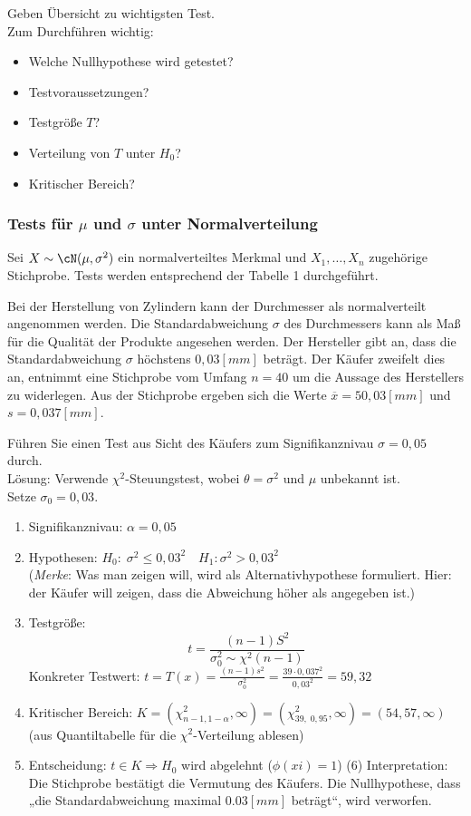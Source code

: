 \documentclass{scrreprt}
\begin{document}
Geben Übersicht zu wichtigsten Test.\\
Zum Durchführen wichtig:
\begin{itemize}
\item Welche Nullhypothese wird getestet?
\item Testvoraussetzungen?
\item Testgröße $T$?
\item Verteilung von $T$ unter $H_0$?
\item Kritischer Bereich?
\end{itemize}

\subsubsection[Tests für mü und sigma unter Normalverteilung]{Tests für $\mu$ und $\sigma$ unter Normalverteilung}

Sei $X\sim \cN(\mu, \sigma^2)$ ein normalverteiltes Merkmal und $X_1, \ldots, X_n$ zugehörige Stichprobe. Tests werden entsprechend der Tabelle 1 durchgeführt.

Bei der Herstellung von Zylindern kann der Durchmesser als normalverteilt
angenommen werden. Die Standardabweichung $\sigma$ des Durchmessers kann als Maß für die Qualität der Produkte angesehen werden. Der Hersteller gibt an, dass die Standardabweichung $\sigma$ höchstens $0,03 \unit{[mm]}$ beträgt. Der Käufer zweifelt dies an, entnimmt eine Stichprobe vom Umfang $n = 40$ um die Aussage des Herstellers zu widerlegen. Aus der Stichprobe ergeben sich die
Werte $\overline{x} = 50,03 \unit{[mm]}$ und $s = 0,037 \unit{[mm]}$.

Führen Sie einen Test aus Sicht des Käufers zum Signifikanznivau $ \sigma = 0,05$ durch.\medskip\\
Lösung: Verwende $\chi^2$-Steuungstest, wobei $\theta = \sigma^2$ und $\mu$ unbekannt ist.\\
Setze $\sigma_0 = 0,03$.
\begin{enumerate}
\item Signifikanznivau: $\alpha = 0,05$
\item Hypothesen: $H_0: \; \sigma^2 \leq 0,03^2 \quad H_1: \sigma^2 > 0,03^2$\\
(\emph{Merke}: Was man zeigen will, wird als Alternativhypothese formuliert. Hier: der Käufer will zeigen, dass die Abweichung höher als angegeben ist.)
\item Testgröße:
$$t=\frac{(n-1)S^2}{\sigma_0^2 \sim \chi^2 (n-1)}$$
Konkreter Testwert: $t=T(x)=\frac{(n-1)s^2}{\sigma_0^2}=\frac{39 \cdot 0,037^2}{0,03^2}=59,32$
\item  Kritischer Bereich: $K=(\chi^2_{n-1, 1-\alpha}, \infty) = (\chi^2_{39, \; 0,95}, \infty) = (54,57, \infty)$\\
(aus Quantiltabelle für die $\chi^2$-Verteilung ablesen)
\item Entscheidung: $t \in K \Rightarrow H_0$ wird abgelehnt ($\phi(xi)=1$)
(6) Interpretation: Die Stichprobe bestätigt die Vermutung des Käufers. Die Nullhypothese, dass „die Standardabweichung maximal $0.03\unit{[mm]}$ beträgt“, wird verworfen.
\end{enumerate}
\end{document}
